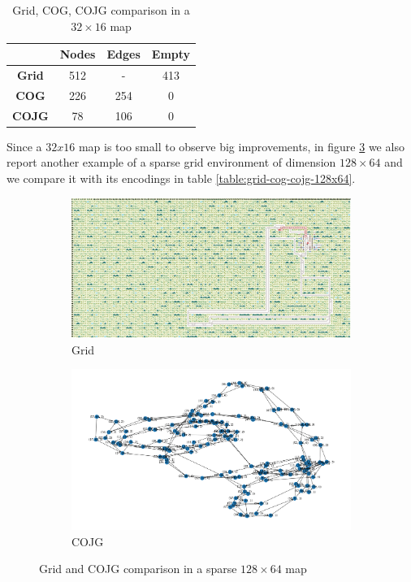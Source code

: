 \documentclass[a4paper,10pt]{report}
\begin{document}
\begin{table}[h]
	\center
	\begin{tabular}{||c c c c||}
		\hline
		              & \textbf{Nodes} & \textbf{Edges} & \textbf{Empty} \\ [0.5ex]
		\hline\hline
		\textbf{Grid} & 512            & -              & \num{413}      \\
		\hline
		\textbf{COG}  & 226            & 254            & 0              \\
		\hline
		\textbf{COJG} & 78             & 106            & 0              \\
		\hline
	\end{tabular}
	\caption{Grid, COG, COJG comparison in a $32\times 16$ map}
	\label{table:grid-cog-cojg-32x16}
\end{table}

Since a $32x16$ map is too small to observe big improvements, in figure \ref{fig:grid-cog-cojg-128x64} we also report another example of a sparse grid environment of dimension $128\times64$ and we compare it with its encodings in table \ref{table:grid-cog-cojg-128x64}.

\begin{figure}[h]
	\begin{subfigure}[b]{\linewidth}
		\includegraphics[width=\textwidth]{grid-env-128x64.png}
		\caption{Grid}
		\label{fig:grid-env-128x64}
	\end{subfigure}%

	\begin{subfigure}[b]{\linewidth}
		\includegraphics[width=\textwidth]{cojg-env-128x64.png}
		\caption{COJG}
		\label{fig:cojg-env-128x64}
	\end{subfigure}%

	\caption{Grid and COJG comparison in a sparse $128\times64$ map}
	\label{fig:grid-cog-cojg-128x64}
\end{figure}
\end{document}
